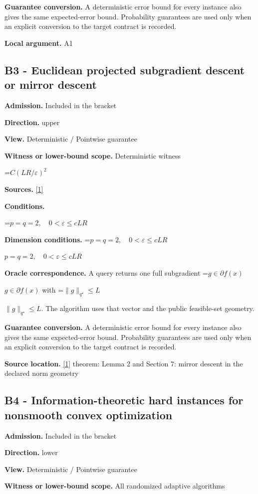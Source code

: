 \documentclass[10pt,a4paper]{article}
\newcommand{\AtlasMath}[1]{\par\begingroup\centering\setbox0=\hbox{$\displaystyle #1$}\ifdim\wd0>1.4\linewidth\typeout{ATLAS WIDE FORMULA: \the\wd0}\fi\ifdim\wd0>\linewidth\resizebox{\linewidth}{!}{\box0}\else\box0\fi\par\endgroup}
\newcommand{\AtlasInlineMath}[1]{\begingroup\setbox0=\hbox{$#1$}\ifdim\wd0>.4\linewidth\endgroup\AtlasMath{#1}\else\endgroup$#1$\fi}
\begin{document}
\textbf{Guarantee conversion.} A deterministic error bound for every instance also gives the same expected-error bound. Probability guarantees are used only when an explicit conversion to the target contract is recorded.

\textbf{Local argument.} A1

\subsection{B3 - Euclidean projected subgradient descent or mirror descent}
\textbf{Admission.} Included in the bracket

\textbf{Direction.} upper

\textbf{View.} Deterministic / Pointwise guarantee

\textbf{Witness or lower-bound scope.} Deterministic witness

\AtlasMath{C(LR/\varepsilon)^2}
\textbf{Sources.} \href{https://arxiv.org/pdf/1107.4080}{[1]}

\textbf{Conditions.} 
\AtlasMath{p=q=2,\quad0<\varepsilon\le cLR}


\textbf{Dimension conditions.} \AtlasInlineMath{p=q=2,\quad0<\varepsilon\le cLR}

\textbf{Oracle correspondence.} A query returns one full subgradient \AtlasInlineMath{g\in\partial f(x)} with \AtlasInlineMath{\|g\|_{q^\star}\le L}. The algorithm uses that vector and the public feasible-set geometry.

\textbf{Guarantee conversion.} A deterministic error bound for every instance also gives the same expected-error bound. Probability guarantees are used only when an explicit conversion to the target contract is recorded.

\textbf{Source location.} \href{https://arxiv.org/pdf/1107.4080}{[1]} theorem: Lemma 2 and Section 7: mirror descent in the declared norm geometry

\subsection{B4 - Information-theoretic hard instances for nonsmooth convex optimization}
\textbf{Admission.} Included in the bracket

\textbf{Direction.} lower

\textbf{View.} Deterministic / Pointwise guarantee

\textbf{Witness or lower-bound scope.} All randomized adaptive algorithms
\end{document}
